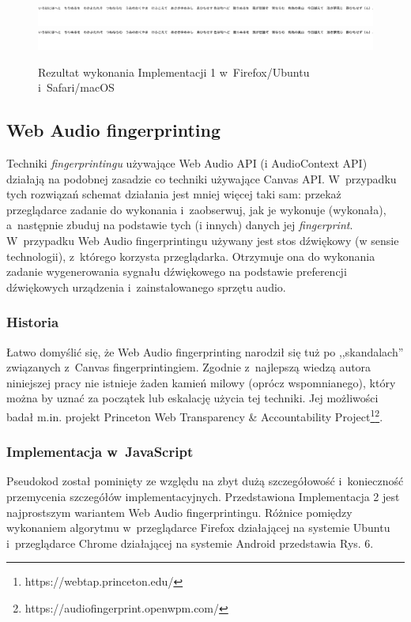 \begin{figure}
	\includegraphics[trim={0 121px 2269px 0},clip,frame]{img/06}
	\includegraphics[trim={0 121px 2269px 0},clip,frame]{img/07}
	\caption{Rezultat wykonania Implementacji 1 w~Firefox/Ubuntu i~Safari/macOS}
\end{figure}

\subsection{Web Audio fingerprinting}
Techniki \emph{fingerprintingu} używające Web Audio API (i AudioContext API)
działają na podobnej zasadzie co techniki używające Canvas API. W~przypadku tych
rozwiązań schemat działania jest mniej więcej taki sam: przekaż przeglądarce
zadanie do wykonania i~zaobserwuj, jak je wykonuje (wykonała), a~następnie
zbuduj na podstawie tych (i innych) danych jej \emph{fingerprint}. W~przypadku
Web Audio fingerprintingu używany jest stos dźwiękowy (w sensie technologii),
z~którego korzysta przeglądarka. Otrzymuje ona do wykonania zadanie
wygenerowania sygnału dźwiękowego na podstawie preferencji dźwiękowych
urządzenia i~zainstalowanego sprzętu audio.

\subsubsection{Historia}
Łatwo domyślić się, że Web Audio fingerprinting narodził się tuż po
,,skandalach'' związanych z~Canvas fingerprintingiem. Zgodnie z~najlepszą wiedzą
autora niniejszej pracy nie istnieje żaden kamień milowy (oprócz wspomnianego),
który można by uznać za początek lub eskalację użycia tej techniki. Jej
możliwości badał m.in. projekt Princeton Web Transparency \& Accountability
Project\footnote{https://webtap.princeton.edu/}\footnote{https://audiofingerprint.openwpm.com/}.

\subsubsection{Implementacja w~JavaScript}
Pseudokod został pominięty ze względu na zbyt dużą szczegółowość i~konieczność
przemycenia szczegółów implementacyjnych. Przedstawiona Implementacja 2 jest
najprostszym wariantem Web Audio fingerprintingu. Różnice pomiędzy wykonaniem
algorytmu w~przeglądarce Firefox działającej na systemie Ubuntu i~przeglądarce
Chrome działającej na systemie Android przedstawia Rys. 6.

